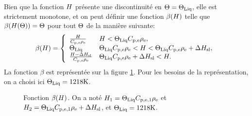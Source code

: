 Bien que la fonction $H$ présente une discontinuité en
$\Theta = \Theta_\text{Liq}$, elle est strictement monotone, et on peut
définir une fonction $\beta(H)$ telle que
$\beta(H(\Theta)) = \Theta$ pour tout
$\Theta$ de la manière suivante:
\begin{equation}\label{eq:beta}
  \beta(\enthalpy) = \left\{
  \begin{array}{ll}
    \frac{\enthalpy}{\electrolytehc\electrolytedensity} %
      & \enthalpy < \tliq \electrolytehc\electrolytedensity,\\
    \tliq %
      & \tliq \electrolytehc\electrolytedensity < \enthalpy < \tliq \electrolytehc\electrolytedensity + \fusionenthalpy,\\
    \frac{\enthalpy - \fusionenthalpy}{\electrolytehc\electrolytedensity} %
      & \tliq\electrolytehc\electrolytedensity + \fusionenthalpy < \enthalpy.\\
  \end{array}
  \right.
\end{equation}
La fonction $\beta$ est représentée sur la figure \ref{fig:beta}. Pour
les besoins de la représentation, on a choisi ici $\Theta_\text{Liq} = 1218\si{\kelvin}$.
\begin{figure}
  \begin{center}
    
    \caption{Fonction $\beta(H)$. On a noté $H_1 =
      \Theta_\text{Liq}C_{\mathrm{p,e,1}}\rho_\mathrm{e}$ et $H_2 =
      \Theta_\text{Liq}C_{\mathrm{p,e,1}}\rho_\mathrm{e} + \Delta H_\mathrm{sl}$, et
      $\Theta_\text{Liq} = 1218\si{\kelvin}$.}
    \label{fig:beta}
  \end{center}
\end{figure}

